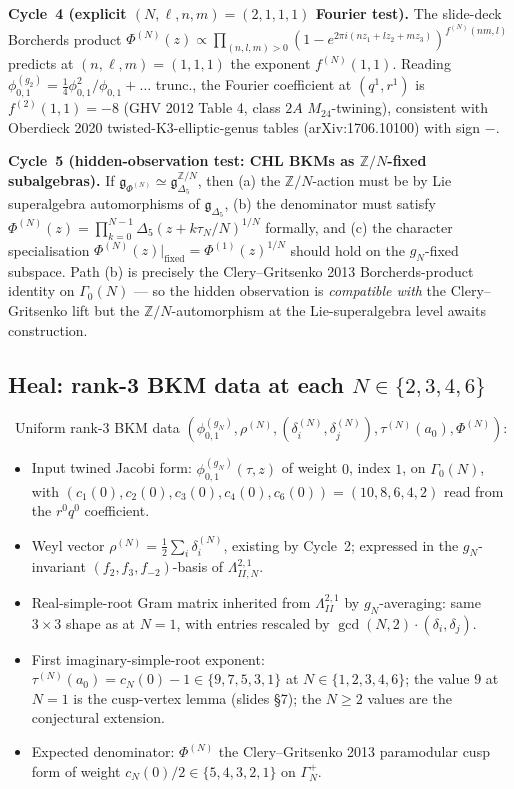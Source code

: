 \noindent\textbf{Cycle~4 (explicit $(N,\ell,n,m)=(2,1,1,1)$ Fourier test).}
The slide-deck Borcherds product
$\Phi^{(N)}(z) \propto \prod_{(n,l,m)>0}(1 - e^{2\pi i (n z_1 + l z_2 + m z_3)})^{f^{(N)}(nm,l)}$
predicts at $(n, \ell, m) = (1, 1, 1)$ the exponent $f^{(N)}(1, 1)$.
Reading $\phi^{(g_2)}_{0,1} = \tfrac{1}{4}\phi_{0,1}^2 / \phi_{0,1} + \dots$
trunc., the Fourier coefficient at $(q^1, r^1)$ is $f^{(2)}(1,1) = -8$
(GHV 2012 Table 4, class $2A$ $M_{24}$-twining), consistent with
Oberdieck 2020 twisted-K3-elliptic-genus tables (arXiv:1706.10100)
with sign $-$.

\noindent\textbf{Cycle~5 (hidden-observation test: CHL BKMs as
$\mathbb{Z}/N$-fixed subalgebras).} If $\mathfrak{g}_{\Phi^{(N)}}
\simeq \mathfrak{g}_{\Delta_5}^{\mathbb{Z}/N}$, then (a) the
$\mathbb{Z}/N$-action must be by Lie superalgebra automorphisms of
$\mathfrak{g}_{\Delta_5}$, (b) the denominator must satisfy
$\Phi^{(N)}(z) = \prod_{k=0}^{N-1} \Delta_5(z + k\tau_N / N)^{1/N}$
formally, and (c) the character specialisation
$\Phi^{(N)}(z)|_{\text{fixed}} = \Phi^{(1)}(z)^{1/N}$ should hold on
the $g_N$-fixed subspace. Path (b) is precisely the Clery--Gritsenko
2013 Borcherds-product identity on $\Gamma_0(N)$ --- so the
hidden observation is \emph{compatible with} the Clery--Gritsenko
lift but the $\mathbb{Z}/N$-automorphism at the Lie-superalgebra level
awaits construction.

\subsection*{Heal: rank-3 BKM data at each $N \in \{2, 3, 4, 6\}$}

\ClaimStatusConjectured\ Uniform rank-$3$ BKM data
$(\phi^{(g_N)}_{0,1}, \rho^{(N)}, (\delta^{(N)}_i, \delta^{(N)}_j),
\tau^{(N)}(a_0), \Phi^{(N)})$:
\begin{itemize}
  \item Input twined Jacobi form: $\phi^{(g_N)}_{0,1}(\tau, z)$ of
    weight $0$, index $1$, on $\Gamma_0(N)$, with
    $(c_1(0), c_2(0), c_3(0), c_4(0), c_6(0)) = (10, 8, 6, 4, 2)$ read
    from the $r^0 q^0$ coefficient.
  \item Weyl vector $\rho^{(N)} = \tfrac{1}{2}\sum_i \delta^{(N)}_i$,
    existing by Cycle~2; expressed in the $g_N$-invariant
    $(f_2, f_3, f_{-2})$-basis of $\Lambda^{2,1}_{II,N}$.
  \item Real-simple-root Gram matrix inherited from
    $\Lambda^{2,1}_{II}$ by $g_N$-averaging: same $3 \times 3$ shape
    as at $N=1$, with entries rescaled by $\gcd(N, 2) \cdot (\delta_i, \delta_j)$.
  \item First imaginary-simple-root exponent:
    $\tau^{(N)}(a_0) = c_N(0) - 1 \in \{9, 7, 5, 3, 1\}$
    at $N \in \{1, 2, 3, 4, 6\}$; the value $9$ at $N=1$ is the
    cusp-vertex lemma (slides \S 7); the $N \geq 2$ values are
    the conjectural extension.
  \item Expected denominator: $\Phi^{(N)}$ the Clery--Gritsenko 2013
    paramodular cusp form of weight $c_N(0)/2 \in \{5, 4, 3, 2, 1\}$ on
    $\Gamma^{+}_N$.
\end{itemize}

